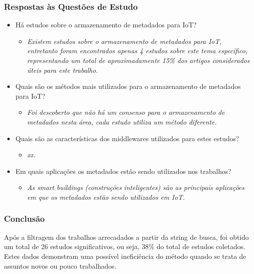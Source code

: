 \subsubsection{Respostas às Questões de Estudo}
\begin{itemize}
  \item Há estudos sobre o armazenamento de metadados para \acrlong{IoT}?
 \begin{itemize}
    \item \textit{Existem estudos sobre o armazenamento de metadados para \acrshort{IoT}, entretanto foram encontrados apenas 4 estudos
    sobre este tema específico, representando um total de aproximadamente 15\% dos artigos considerados úteis para este trabalho.}
  \end{itemize}
  \item Quais são os métodos mais utilizados para o armazenamento de metadados para \acrshort{IoT}?
    \begin{itemize}
    \item \textit{Foi descoberto que não há um consenso para o armazenamento de metadados nesta área, cada estudo utiliza um método diferente.}
  \end{itemize}
  \item Quais são as características dos middlewares utilizados para estes estudos?
  \begin{itemize}
    \item \textit{xx.}
    \end{itemize}
  \item Em quais aplicações os metadados estão sendo utilizados nos trabalhos?
  \begin{itemize}
    \item \textit{As smart buildings (construções inteligentes) são as principais aplicações em que os metadados estão sendo utilizados em \acrshort{IoT}.}
  \end{itemize}
\end{itemize}

\subsubsection{Conclusão}
\quad Após a filtragem dos trabalhos arrecadados a partir da string de busca, foi obtido um total de 26 estudos significativos,
ou seja, 38\% do total de estudos coletados. Estes dados demonstram uma possível ineficiência do método quando se trata de assuntos
novos ou pouco trabalhados.


